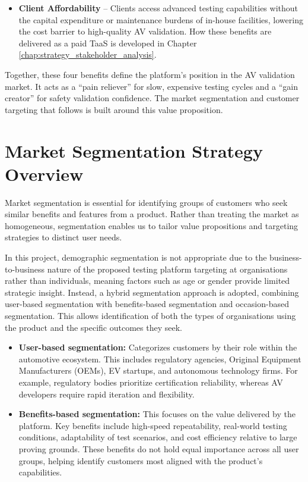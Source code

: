 \documentclass[11pt, a4paper]{report}
\numberwithin{equation}{section}
\begin{document}
\begin{refsection}
\begin{itemize}
\item \textbf{Client Affordability} -- Clients access advanced testing capabilities without the capital expenditure or maintenance burdens of in-house facilities, lowering the cost barrier to high-quality AV validation. How these benefits are delivered as a paid TaaS is developed in Chapter \ref{chap:strategy_stakeholder_analysis}.
\end{itemize}

Together, these four benefits define the platform's position in the AV validation market. It acts as a “pain reliever” for slow, expensive testing cycles and a “gain creator” for safety validation confidence. The market segmentation and customer targeting that follows is built around this value proposition.

\section{Market Segmentation Strategy Overview}
\label{sec:segmentation}

Market segmentation is essential for identifying groups of customers who seek similar benefits and features from a product. Rather than treating the market as homogeneous, segmentation enables us to tailor value propositions and targeting strategies to distinct user needs.

In this project, demographic segmentation is not appropriate due to the business-to-business nature of the proposed testing platform targeting at organisations rather than individuals, meaning factors such as age or gender provide limited strategic insight. Instead, a hybrid segmentation approach is adopted, combining user-based segmentation with benefits-based segmentation and occasion-based segmentation. This allows identification of both the types of organisations using the product and the specific outcomes they seek. 

\begin{itemize}
    \item \textbf{User-based segmentation:} Categorizes customers by their role within the automotive ecosystem. This includes regulatory agencies, Original Equipment Manufacturers (OEMs), EV startups, and autonomous technology firms. For example, regulatory bodies prioritize certification reliability, whereas AV developers require rapid iteration and flexibility.
    
    \item \textbf{Benefits-based segmentation:} This focuses on the value delivered by the platform. Key benefits include high-speed repeatability, real-world testing conditions, adaptability of test scenarios, and cost efficiency relative to large proving grounds. These benefits do not hold equal importance across all user groups, helping identify customers most aligned with the product’s capabilities.
    

\end{itemize}
\end{refsection}
\end{document}
